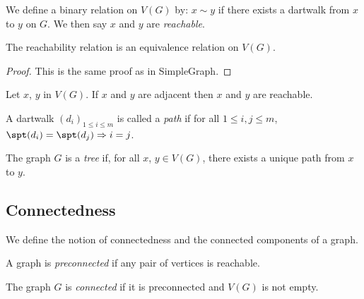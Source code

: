 \begin{definition}
  \label{def:reachable}
  We define a binary relation on $V(G)$ by: $x \sim y$ if there exists a dartwalk
  from $x$ to $y$ on $G$. We then say $x$ and $y$ are \emph{reachable}.
\end{definition}

\begin{proposition}
  \label{prop:reachable_is_equivalence}
  \leanok
  The reachability relation is an equivalence relation on $V(G)$.
\end{proposition}

\begin{proof}
  This is the same proof as in SimpleGraph.
\end{proof}

\begin{lemma}
  \label{lem:adj_towalk}
  \leanok
  Let $x$, $y$ in $V(G)$. If $x$ and $y$ are adjacent then $x$ and $y$ are reachable.
\end{lemma}

\begin{definition}
  \label{def:dartpath}
  A dartwalk $(d_i)_{1 \leq i \leq m}$ is called a \emph{path} if
  for all $1 \leq i,j \leq m$, $\spt(d_i) = \spt(d_j) \Rightarrow i=j$.
\end{definition}

\begin{definition}
  \label{def:tree}
  The graph $G$ is a \emph{tree} if, for all $x$, $y \in V(G)$,
  there exists a unique path from $x$ to $y$.
\end{definition}

\subsection{Connectedness}

We define the notion of connectedness and the connected components of a graph.

\begin{definition}
  \label{def:preconnected}
  \leanok
  A graph is \emph{preconnected} if any pair of vertices is reachable.
\end{definition}

\begin{definition}
  \label{def:connected}
  \leanok
  The graph $G$ is \emph{connected} if it is preconnected and $V(G)$ is not empty.
\end{definition}

